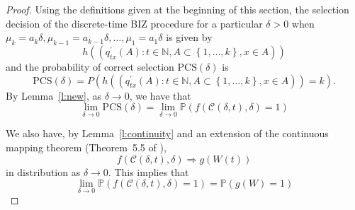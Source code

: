 \documentclass{wscpaperproc}
\theoremstyle{wsc}
\begin{document}




\begin{proof}
Using the definitions given at the beginning of this section,
the selection decision of the discrete-time BIZ procedure for a particular $\delta>0$ when $\mu_{k}=a_{k}\delta,\mu_{k-1}=a_{k-1}\delta,\ldots,\mu_{1}=a_{1}\delta$ is given by
\begin{equation*}
h\left(\left(q_{tx}^{'}\left(A\right):t\in\mathbb{N},A\subset\left\{ 1,\ldots,k\right\} ,x\in A\right)\right)
\end{equation*}
and the probability of correct selection $\mbox{PCS}(\delta)$ is
\begin{equation*}
    \mbox{PCS}(\delta) = P\left( h\left( \left(q_{tx}^{'}\left(A\right):t\in\mathbb{N},A\subset\left\{ 1,\ldots,k\right\} ,x\in A\right) \right) =k\right).
\end{equation*}
By Lemma~\ref{l:new}, as $\delta\to0$, we have that 
\begin{equation}
\lim_{\delta\to0}
\mbox{PCS}(\delta)
 = \lim_{\delta\rightarrow0}
 \mathbb{P}\left(
 f\left(\mathcal{C}\left(\delta,t\right),\delta\right)=1
 \right)
 \label{eq:convergence1}
\end{equation}

We also have, by Lemma~\ref{l:continuity} and an extension of the continuous mapping theorem (Theorem~5.5 of ), 
\begin{equation*}
    f\left(\mathcal{C}\left(\delta,t\right),\delta\right)\Rightarrow g\left(W\left(t\right)\right)
\end{equation*}
in distribution as $\delta\rightarrow0$.
This implies that
\begin{equation}
\lim_{\delta\rightarrow0}\mathbb{P}\left(f\left(\mathcal{C}\left(\delta,t\right),\delta\right)=1\right)
 = \mathbb{P}\left(g\left(W\right)=1\right)
 \label{eq:convergence2}
\end{equation}


\end{proof}
\end{document}
